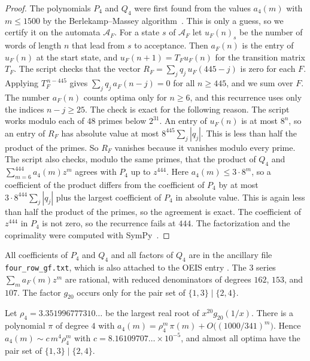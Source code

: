 \begin{proof}
The polynomials $P_4$ and $Q_4$ were first found from the values $a_4(m)$ with
$m\le1500$ by the Berlekamp--Massey algorithm~\cite{massey1969}. This is only a
guess, so we certify it on the automata $\mathcal A_F$. For a state $s$ of
$\mathcal A_F$ let $u_F(n)_s$ be the number of words of length $n$ that lead
from $s$ to acceptance. Then $a_F(n)$ is the entry of $u_F(n)$ at the start
state, and $u_F(n+1)=T_Fu_F(n)$ for the transition matrix $T_F$. The script
checks that the vector $R_F=\sum_jq_j\,u_F(445-j)$ is zero for each $F$. Applying
$T_F^{\,n-445}$ gives $\sum_jq_j\,a_F(n-j)=0$ for all $n\ge445$, and we sum over
$F$. The number $a_F(n)$ counts optima only for $n\ge6$, and this recurrence
uses only the indices $n-j\ge25$. The check is exact for the following reason. The script works modulo each
of $48$ primes below $2^{31}$. An entry of $u_F(n)$ is at most $8^n$, so an entry
of $R_F$ has absolute value at most $8^{445}\sum_j|q_j|$. This is less than half
the product of the primes. So $R_F$ vanishes because it vanishes modulo every
prime. The script also checks, modulo the same primes, that the product of
$Q_4$ and $\sum_{m=6}^{444}a_4(m)z^m$ agrees with $P_4$ up to $z^{444}$. Here
$a_4(m)\le3\cdot8^m$, so a coefficient of the product differs from the
coefficient of $P_4$ by at most $3\cdot8^{444}\sum_j|q_j|$ plus the largest
coefficient of $P_4$ in absolute value. This is again less than half the
product of the primes, so the agreement is exact. The coefficient of
$z^{444}$ in $P_4$ is not zero, so the recurrence fails at $444$. The
factorization and the coprimality were computed with SymPy~\cite{sympy2017}.
\end{proof}

All coefficients of $P_4$ and $Q_4$ and all factors of $Q_4$ are in the
ancillary file \nolinkurl{four_row_gf.txt}, which is also attached to the OEIS
entry . The $3$ series $\sum_ma_F(m)z^m$ are rational, with
reduced denominators of degrees $162$, $153$, and $107$. The factor $g_{20}$
occurs only for the pair set of $\{1,3\}\mid\{2,4\}$.

\begin{corollary}\label{cor:fourgrowth}
Let $\rho_4=3.351996777310\ldots$ be the largest real root of
$x^{20}g_{20}(1/x)$. There is a polynomial $\pi$ of degree $4$ with
$a_4(m)=\rho_4^m\,\pi(m)+O\bigl((1000/341)^m\bigr)$. Hence
$a_4(m)\sim c\,m^4\rho_4^m$ with $c=8.16109707\ldots\times10^{-5}$, and almost all
optima have the pair set of $\{1,3\}\mid\{2,4\}$.
\end{corollary}

